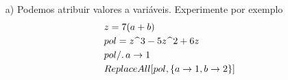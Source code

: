 \documentclass[11pt]{article}
\begin{document}
  
  \begin{itemize}
  
  
  
  
  
  
  
  
  
  
  
  


\item[a)] Podemos atribuir valores a vari\'aveis. Experimente por exemplo
 \[\begin{array}{l}

 z = 7 (a + b)
 
    \vspace{1mm}
\\

pol= z\ \widehat{}\ 3 - 5 z\ \widehat{}\ 2 + 6 z 
 
     \vspace{1mm}
\\


pol /.\,a \rightarrow 1 

     \vspace{1mm}
\\

ReplaceAll[pol,\{a \rightarrow 1,b \rightarrow 2 \}]





     \vspace{1mm}
\\



\end{array}\]
\end{itemize}
\end{document}
